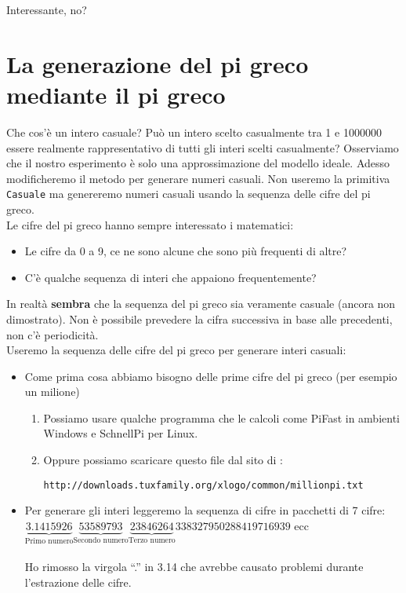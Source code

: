 Interessante, no?



\section{La generazione del pi greco mediante il pi greco\textellipsis}
Che cos'è un intero casuale? Può un intero scelto casualmente tra 1 e 1000000 essere realmente rappresentativo di tutti gli interi scelti casualmente? Osserviamo che il nostro esperimento è solo una approssimazione del modello ideale. Adesso modificheremo il metodo per generare numeri casuali\textellipsis. Non useremo la primitiva \texttt{Casuale} ma genereremo numeri casuali usando la sequenza delle cifre del pi greco.\\
Le cifre del pi greco hanno sempre interessato i matematici:
\begin{itemize}
 \item Le cifre da 0 a 9, ce ne sono alcune che sono più frequenti di altre?
 \item C'è qualche sequenza di interi che appaiono frequentemente?
\end{itemize}

In realtà \textbf{sembra} che la sequenza del pi greco sia veramente casuale (ancora non dimostrato). Non è possibile prevedere la cifra successiva in base alle precedenti, non c'è periodicità.\\
Useremo la sequenza delle cifre del pi greco per generare interi casuali:

\begin{itemize}
 \item Come prima cosa abbiamo bisogno delle prime cifre del pi greco (per esempio un milione) 
	 \begin{enumerate}
 		\item Possiamo usare qualche programma che le calcoli come PiFast in ambienti Windows e SchnellPi per Linux.
 		\item Oppure possiamo scaricare questo file dal sito di \xlogo:
		\begin{center}
			\texttt{http://downloads.tuxfamily.org/xlogo/common/millionpi.txt} 
		\end{center}
 	\end{enumerate}
	\item Per generare gli interi leggeremo la sequenza di cifre in pacchetti di 7 cifre:\\
$\underbrace{3.1415926}_{\textrm{Primo numero}}\underbrace{53589793}_{\textrm{Secondo numero}}\underbrace{23846264}_{\textrm{Terzo numero}}338327950288419716939$ ecc\\ \\
Ho rimosso la virgola ``.'' in  3.14 che avrebbe causato problemi durante l'estrazione delle cifre.
\end{itemize}

